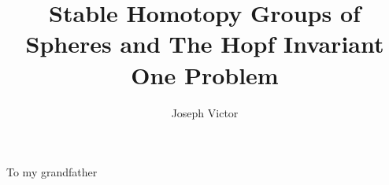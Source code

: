 \documentclass[a4paper,12pt]{article}
\newenvironment{dedication}
{
   \cleardoublepage
   \thispagestyle{empty}
   \vspace*{\stretch{1}}
   \hfill\begin{minipage}[t]{0.66\textwidth}
   \raggedright
}%
{
   \end{minipage}
   \vspace*{\stretch{3}}
   \clearpage
}
\begin{document}
\newcommand{\A}[0]{\mathcal{A}}
\newcommand{\Z}[0]{\mathbb{Z}}
\newcommand{\R}[0]{\mathbb{R}}
\newcommand{\C}[0]{\mathbb{C}}
\newcommand{\OO}[0]{\mathcal{O}}
\newcommand{\F}[0]{\mathbb{F}}
\newcommand{\binomial}[2]{\left(\begin{array}{c}#1\\#2\end{array}\right)}
\newcommand{\from}[0]{\longleftarrow}

\newtheorem{Def}{Definition}[subsection]
\newtheorem{Theorem}[Def]{Theorem}
\newtheorem{Lemma}[Def]{Lemma}
\newtheorem{Cor}[Def]{Corollary}
\newtheorem{RefDiagram}[Def]{Diagram}
\newtheorem{Remark}[Def]{Remark}

\newcommand{\Hom}{\operatorname{Hom}\nolimits}
\newcommand{\Ext}{\operatorname{Ext}\nolimits}
\newcommand{\Torsion}{\operatorname{Torsion}\nolimits}
\newcommand{\Cyl}{\operatorname{Cyl}\nolimits}
\newcommand{\Ker}{\operatorname{Ker}\nolimits}
\newcommand{\im}{\operatorname{Im}\nolimits}



\title{Stable Homotopy Groups of Spheres and The Hopf Invariant One Problem}
\author{Joseph Victor}
\maketitle

\begin{dedication}
  To my grandfather
\end{dedication}


\newpage
\tableofcontents
\newpage
 


\newpage

\newpage

\newpage

\newpage

\newpage

\newpage



\newpage
\appendix
\appendixpage
\addappheadtotoc

\newpage


\newpage


\end{document}
